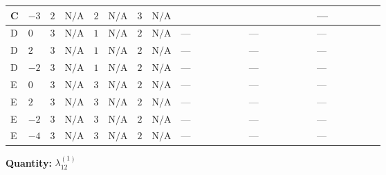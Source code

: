 \documentclass[8pt]{article}
\begin{document}
\begin{landscape}
\begin{longtable}{@{}llcccccc >{\raggedright\arraybackslash}p{0.21\linewidth} >{\raggedright\arraybackslash}p{0.21\linewidth} >{\raggedright\arraybackslash}p{0.21\linewidth}@{}}
\midrule
C & $-3$ & $2$ & $\text{N/A}$ & $2$ & $\text{N/A}$ & $3$ & $\text{N/A}$ & \scriptsize\adjustbox{max width=\linewidth}{$\begin{gathered} +\frac{27 {g_1}^4}{4}\end{gathered}$} & \scriptsize\adjustbox{max width=\linewidth}{$\begin{gathered} +\frac{3 {\lambda_{12}^{(A)}}^2}{4}\end{gathered}$} & --- \\
\midrule
D & $0$ & $3$ & $\text{N/A}$ & $1$ & $\text{N/A}$ & $2$ & $\text{N/A}$ & --- & --- & --- \\
\midrule
D & $2$ & $3$ & $\text{N/A}$ & $1$ & $\text{N/A}$ & $2$ & $\text{N/A}$ & --- & --- & --- \\
\midrule
D & $-2$ & $3$ & $\text{N/A}$ & $1$ & $\text{N/A}$ & $2$ & $\text{N/A}$ & --- & --- & --- \\
\midrule
E & $0$ & $3$ & $\text{N/A}$ & $3$ & $\text{N/A}$ & $2$ & $\text{N/A}$ & --- & --- & --- \\
\midrule
E & $2$ & $3$ & $\text{N/A}$ & $3$ & $\text{N/A}$ & $2$ & $\text{N/A}$ & --- & --- & --- \\
\midrule
E & $-2$ & $3$ & $\text{N/A}$ & $3$ & $\text{N/A}$ & $2$ & $\text{N/A}$ & --- & --- & --- \\
\midrule
E & $-4$ & $3$ & $\text{N/A}$ & $3$ & $\text{N/A}$ & $2$ & $\text{N/A}$ & --- & --- & --- \\
\midrule
\bottomrule
\end{longtable}
\clearpage
\noindent\textbf{Quantity: }$\lambda_{12}^{(1)}$\par\smallskip

\end{landscape}
\end{document}
